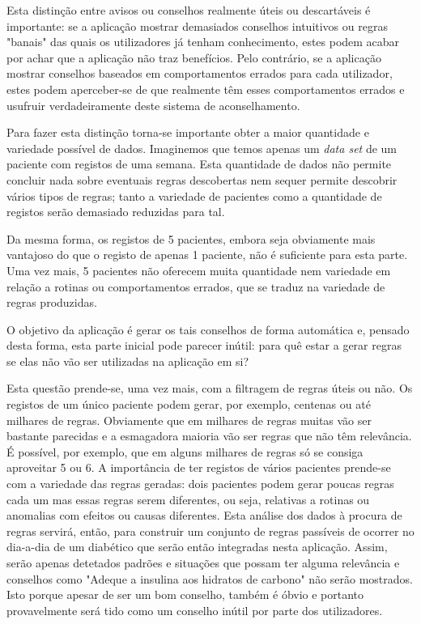 Esta distinção entre avisos ou conselhos realmente úteis ou descartáveis é importante: se a aplicação mostrar demasiados conselhos intuitivos ou regras "banais" das quais os utilizadores já tenham conhecimento, estes podem acabar por achar que a aplicação não traz benefícios. Pelo contrário, se a aplicação mostrar conselhos baseados em comportamentos errados para cada utilizador, estes podem aperceber-se de que realmente têm esses comportamentos errados e usufruir verdadeiramente deste sistema de aconselhamento. 

Para fazer esta distinção torna-se importante obter a maior quantidade e variedade possível de dados. Imaginemos que temos apenas um \textit{data set} de um paciente com registos de uma semana. Esta quantidade de dados não permite concluir nada sobre eventuais regras descobertas nem sequer permite descobrir vários tipos de regras; tanto a variedade de pacientes como a quantidade de registos serão demasiado reduzidas para tal. 

Da mesma forma, os registos de 5 pacientes, embora seja obviamente mais vantajoso do que o registo de apenas 1 paciente, não é suficiente para esta parte. Uma vez mais, 5 pacientes não oferecem muita quantidade nem variedade em relação a rotinas ou comportamentos errados, que se traduz na variedade de regras produzidas. 

O objetivo da aplicação é gerar os tais conselhos de forma automática e, pensado desta forma, esta parte inicial pode parecer inútil: para quê estar a gerar regras se elas não vão ser utilizadas na aplicação em si? 

Esta questão prende-se, uma vez mais, com a filtragem de regras úteis ou não. Os registos de um único paciente podem gerar, por exemplo, centenas ou até milhares de regras. Obviamente que em milhares de regras muitas vão ser bastante parecidas e a esmagadora maioria vão ser regras que não têm relevância. É possível, por exemplo, que em alguns milhares de regras só se consiga aproveitar 5 ou 6. A importância de ter registos de vários pacientes prende-se com a variedade das regras geradas: dois pacientes podem gerar poucas regras cada um mas essas regras serem diferentes, ou seja, relativas a rotinas ou anomalias com efeitos ou causas diferentes. Esta análise dos dados à procura de regras servirá, então, para construir um conjunto de regras passíveis de ocorrer no dia-a-dia de um diabético que serão então integradas nesta aplicação. Assim, serão apenas detetados padrões e situações que possam ter alguma relevância e conselhos como "Adeque a insulina aos hidratos de carbono" não serão mostrados. Isto porque apesar de ser um bom conselho, também é óbvio e portanto provavelmente será tido como um conselho inútil por parte dos utilizadores. 

